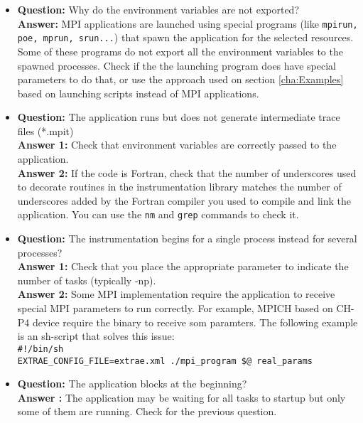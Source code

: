 \begin{itemize}

\item {\bf Question:} Why do the environment variables are not exported?\\
      {\bf Answer:  } MPI applications are launched using special programs (like {\tt mpirun, poe, mprun, srun...}) that spawn the application for the selected resources. Some of these programs do not export all the environment variables to the spawned processes. Check if the the launching program does have special parameters to do that, or use the approach used on section \ref{cha:Examples} based on launching scripts instead of MPI applications.

\item {\bf Question:} The application runs but does not generate intermediate trace files (*.mpit)\\
      {\bf Answer 1:} Check that environment variables are correctly passed to the application.\\
      {\bf Answer 2:} If the code is Fortran, check that the number of underscores used to decorate routines in the instrumentation library matches the number of underscores added by the Fortran compiler you used to compile and link the application. You can use the {\tt nm} and {\tt grep} commands to check it. 

\item {\bf Question:} The instrumentation begins for a single process instead for several processes?\\
      {\bf Answer 1:} Check that you place the appropriate parameter to indicate the number of tasks (typically -np).\\
      {\bf Answer 2:} Some MPI implementation require the application to receive special MPI parameters to run correctly. For example, MPICH based on CH-P4 device require the binary to receive som paramters. The following example is an sh-script that solves this issue:\\
      {\tt \#!/bin/sh\\
           EXTRAE\_CONFIG\_FILE=extrae.xml ./mpi\_program \$@ real\_params}\\

\item {\bf Question:} The application blocks at the beginning?\\
      {\bf Answer  :} The application may be waiting for all tasks to startup but only some of them are running. Check for the previous question.


\end{itemize}
